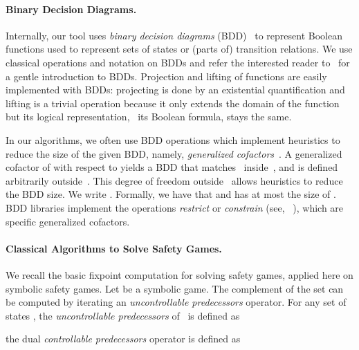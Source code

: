 \documentclass[submission,copyright,creativecommons]{eptcs}
\begin{document}
\paragraph{Binary Decision Diagrams.}
Internally, our tool uses \emph{binary decision diagrams} (BDD)~\cite{bryant86}
to represent Boolean functions used to represent sets of states or (parts of)
transition relations.
We use classical operations and notation on BDDs and refer the interested reader
to~\cite{Andersen97anintroduction} for a gentle introduction to BDDs\@. 
Projection and lifting of functions are easily implemented with BDDs:
projecting is done by an existential quantification and lifting is a trivial
operation because it only extends the domain of the function but its logical
representation, \ie\ its Boolean formula, stays the same.

In our algorithms, we often use BDD operations which implement heuristics to
reduce the size of the given BDD\@,
namely, \emph{generalized cofactors}~\cite{tslbs-v90,shs-vb94}. 
A generalized
cofactor  of  with respect to  yields a BDD 
that matches~ inside~, and is defined arbitrarily outside~.
This degree of freedom outside~ allows heuristics to reduce the BDD size.
We write . Formally, we have that  and  has at most the size of . BDD libraries
implement the operations \emph{restrict} or \emph{constrain} (see,
\eg~\cite{somenzi99}), which are specific generalized cofactors.

\paragraph{Classical Algorithms to Solve Safety Games.}
We recall the basic fixpoint computation for solving safety games, applied here
on symbolic safety games.  Let  be a symbolic game.
The complement of the set  can be computed by
iterating an \emph{uncontrollable predecessors} operator.  For any set of states
, the \emph{uncontrollable predecessors} of~ is defined as

the dual \emph{controllable predecessors} operator is defined as
\end{document}
